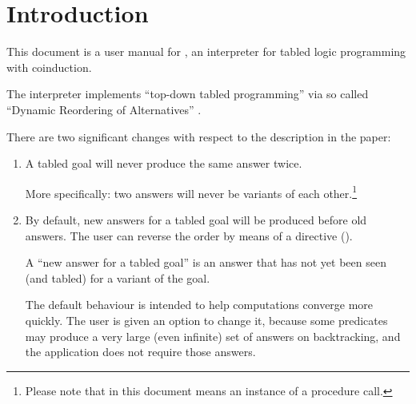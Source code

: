 \chapter{Introduction\label{sec:intro}}

This document is a user manual for , an interpreter for tabled
logic programming with coinduction.

The interpreter implements ``top-down tabled programming'' via so called
``Dynamic Reordering of Alternatives'' \cite{guo-gupta-dra}.

There are two significant changes with respect to the description in the
paper:
\begin{enumerate}

\item A tabled goal will never produce the same answer twice.

  More specifically: two answers will never be variants of each
  other.\footnote{
  Please note that in this document  means an instance of a
  procedure call.}

\item By default, new answers for a tabled goal will be produced before old
  answers.  The user can reverse the order by means of a directive
  ().

  A ``new answer for a tabled goal'' is an answer that has not yet been seen
  (and tabled) for a variant of the goal.

  The default behaviour is intended to help computations converge more
  quickly.  The user is given an option to change it, because some predicates
  may produce a very large (even infinite) set of answers on backtracking,
  and the application does not require those answers.
\end{enumerate}
